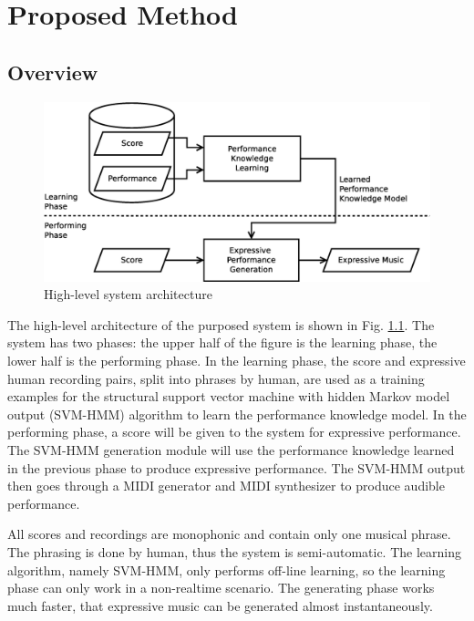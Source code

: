 \chapter{Proposed Method}
\label{chap:proposed}
\section{Overview}
      \begin{figure}[tp]
         \begin{center}
            \includegraphics[width=\textwidth]{fig/high_lev_arch}
         \end{center}
         \caption{High-level system architecture} 
         \label{fig:flow}
      \end{figure}
The high-level architecture of the purposed system is shown in Fig. \ref{fig:flow}. The system has two phases: the upper half of the figure is the learning phase, the lower half is the performing phase. In the learning phase, the score and expressive human recording pairs, split into phrases by human, are used as a training examples for the structural support vector machine with hidden Markov model output (SVM-HMM) algorithm to learn the performance knowledge model. In the performing phase, a score will be given to the system for expressive performance. The SVM-HMM generation module will use the performance knowledge learned in the previous phase to produce expressive performance. The SVM-HMM output then goes through a MIDI generator and MIDI synthesizer to produce audible performance.

All scores and recordings are monophonic and contain only one musical phrase. The phrasing is done by human, thus the system is semi-automatic. The learning algorithm, namely SVM-HMM, only performs off-line learning, so the learning phase can only work in a non-realtime scenario. The generating phase works much faster, that expressive music can be generated almost instantaneously. 

